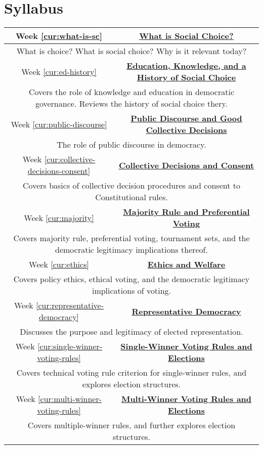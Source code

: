 
\chapter{Syllabus}

{
    \newcommand{\sylweek}[3]{

        Week \ref{cur:#1} & \textbf{\hyperref[cur:#1]{#2}} \\
        \hline
        \multicolumn{2}{|X|}{\centering
            #3
        } \\
        \hline
    }
    \begin{table}[h]
        \label{syllabus}
        \centering
        \begin{tabularx}{\linewidth}{|c|c|}
            \hline

            \sylweek{what-is-sc}{What is Social Choice?}{What is choice?  What is social choice?  Why is it relevant today?}

            \sylweek{ed-history}{Education, Knowledge, and a History of Social Choice}{Covers the role of knowledge and education in democratic governance.  Reviews the history of social choice thery.}

            \sylweek{public-discourse}{Public Discourse and Good Collective Decisions}{The role of public discourse in democracy.}

            \sylweek{collective-decisions-consent}{Collective Decisions and Consent}{Covers basics of collective decision procedures and consent to  Constitutional rules.}

            \sylweek{majority}{Majority Rule and Preferential Voting}{Covers majority rule, preferential voting, tournament sets, and the democratic legitimacy implications thereof.}

            \sylweek{ethics}{Ethics and Welfare}{Covers policy ethics, ethical voting, and the democratic legitimacy implications of voting.}

            \sylweek{representative-democracy}{Representative Democracy}{Discusses the purpose and legitimacy of elected representation.}

            \sylweek{single-winner-voting-rules}{Single-Winner Voting Rules and Elections}{Covers technical voting rule criterion for single-winner rules, and explores election structures.}

            \sylweek{multi-winner-voting-rules}{Multi-Winner Voting Rules and Elections}{Covers multiple-winner rules, and further explores election structures.}


\end{tabularx}
\end{table}}
